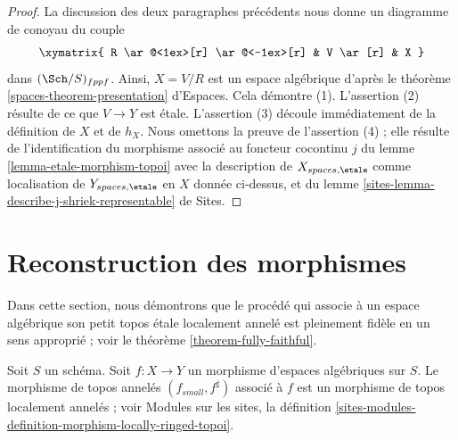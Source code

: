 \begin{proof}
\medskip\noindent
La discussion des deux paragraphes précédents nous donne un
diagramme de conoyau du couple
$$
\xymatrix{
R \ar@<1ex>[r] \ar@<-1ex>[r] &
V \ar[r] &
X
}
$$
dans $(\Sch/S)_{fppf}$. Ainsi, $X = V/R$ est un espace algébrique d'après le
théorème \ref{spaces-theorem-presentation} d'Espaces. Cela démontre (1).
L'assertion (2) résulte de ce que $V \to Y$ est \'etale. L'assertion (3) découle immédiatement
de la définition de $X$ et de $h_X$. Nous omettons la preuve de l'assertion (4) ;
elle résulte de l'identification du morphisme associé au foncteur cocontinu
$j$ du lemme \ref{lemma-etale-morphism-topoi}
avec la description de $X_{spaces, \etale}$ comme localisation
de $Y_{spaces, \etale}$ en $X$ donnée ci-dessus, et du
lemme \ref{sites-lemma-describe-j-shriek-representable} de Sites.
\end{proof}







\section{Reconstruction des morphismes}
\label{section-morphisms}

\noindent
Dans cette section, nous démontrons que le procédé qui associe à un espace algébrique
son petit topos \'etale localement annelé est pleinement fidèle en un sens
approprié ; voir le
théorème \ref{theorem-fully-faithful}.

\begin{lemma}
\label{lemma-morphism-locally-ringed}
Soit $S$ un schéma.
Soit $f : X \to Y$ un morphisme d'espaces algébriques sur $S$.
Le morphisme de topos annelés $(f_{small}, f^\sharp)$
associé à $f$ est un morphisme de topos localement annelés ; voir
Modules sur les sites,
la définition \ref{sites-modules-definition-morphism-locally-ringed-topoi}.
\end{lemma}

